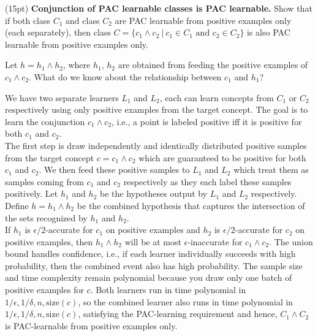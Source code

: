 \documentclass[11pt]{article}
\DeclareMathOperator{\1}{\mathbbm{1}}
\begin{document}
\begin{problem}(15pt) \textbf{Conjunction of PAC learnable classes is PAC learnable.}  
Show that if both class $C_1$ and class $C_2$ are PAC learnable from
positive examples only (each separately), then class $C=\{c_1\wedge c_2\ |\
c_1\in C_1\mbox{ and } c_2\in C_2\}$ is also PAC learnable from positive
examples only.
\end{problem} 
\begin{hint}
Let $h = h_1 \wedge h_2$, where $h_1$, $h_2$ are obtained from feeding the positive 
examples of $c_1\wedge c_2$. What do we know about the relationship between $c_1$
and $h_1$?
\end{hint}
We have two separate learners $L_1$ and $L_2$, each can learn concepts from $C_1$ or $C_2$ respectively using only positive examples from the target concept. The goal is to learn the conjunction $c_1 \wedge c_2$, i.e., a point is labeled positive iff it is positive for both $c_1$ and $c_2$. \\
The first step is draw independently and identically distributed positive samples from the target concept $c=c_1 \wedge c_2$ which are guaranteed to be positive for both $c_1$ and $c_2$. We then feed these positive samples to $L_1$ and $L_2$ which treat them as samples coming from $c_1$ and $c_2$ respectively as they each label these samples positively. Let $h_1$ and $h_2$ be the hypotheses output by $L_1$ and $L_2$ respectively. Define $h=h_1 \wedge h_2$ be the combined hypothesis that captures the intersection of the sets recognized by $h_1$ and $h_2$. \\
If $h_1$ is $\epsilon/2$-accurate for $c_1$ on positive examples and $h_2$ is $\epsilon/2$-accurate for $c_2$ on positive examples, then $h_1 \wedge h_2$ will be at most $\epsilon$-inaccurate for $c_1 \wedge c_2$. The union bound handles confidence, i.e., if each learner individually succeeds with high probability, then the combined event also has high probability. The sample size and time complexity remain polynomial because you draw only one batch of positive examples for $c$. Both learners run in time polynomial in $1/\epsilon, 1/\delta, n, \text{size}(c)$, so the combined learner also runs in time polynomial in $1/\epsilon, 1/\delta, n, \text{size}(c)$, satisfying the PAC-learning requirement and hence, $C_1 \wedge C_2$ is PAC-learnable from positive examples only.

\end{document}
